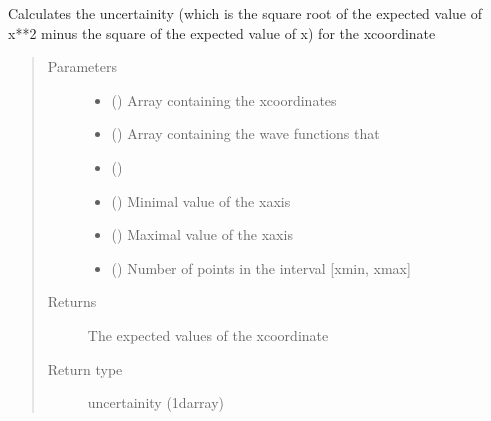 \documentclass[letterpaper,12,english]{sphinxmanual}
\begin{document}
\begin{fulllineitems}
\label{\detokenize{api:solvers.calculate_uncertainity}}
Calculates the uncertainity (which is the square root of the expected
value of x**2 minus the square of the expected value of x) for
the x\sphinxhyphen{}coordinate
\begin{quote}\begin{description}
\item[{Parameters}] \leavevmode\begin{itemize}
\item {} 
 () \textendash{} Array containing the x\sphinxhyphen{}coordinates

\item {} 
 () \textendash{} Array containing the wave functions that

\item {} 
 () \textendash{} 

\item {} 
 () \textendash{} Minimal value of the x\sphinxhyphen{}axis

\item {} 
 () \textendash{} Maximal value of the x\sphinxhyphen{}axis

\item {} 
 () \textendash{} Number of points in the interval {[}xmin, xmax{]}

\end{itemize}

\item[{Returns}] \leavevmode
The expected values of the x\sphinxhyphen{}coordinate

\item[{Return type}] \leavevmode
uncertainity (1darray)

\end{description}\end{quote}

\end{fulllineitems}
\end{document}

